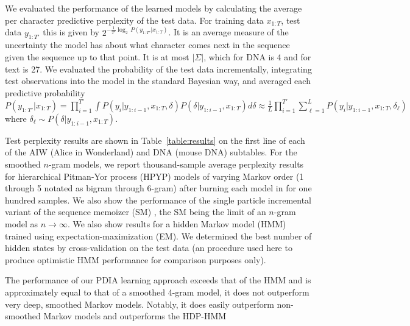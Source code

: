 We evaluated the performance of the learned models by calculating the average per character predictive perplexity of the test data.  For training data $x_{1:T}$, test data $y_{1:T'}$ this is given by $2^{-\frac{1}{T'}\log_2\, P(y_{1:T'}|x_{1:T})}$.  It is an average measure of the uncertainty the model has about what character comes next in the sequence given the sequence up to that point. It is at most $|\Sigma|$, which for DNA is 4 and for text is 27.  We evaluated the probability of the test data incrementally, integrating test observations into the model in the standard Bayesian way, and averaged each predictive probability $P(y_{1:T'}|x_{1:T}) =  \prod_{i = 1}^{T'} \int P(y_i|y_{1:i-1},x_{1:T},\delta)P(\delta|y_{1:i-1},x_{1:T})d\delta \approx \frac{1}{L}\prod_{i = 1}^{T'} \sum_{\ell = 1}^{L} P(y_i|y_{1:i-1},x_{1:T},\delta_\ell)$ where $\delta_\ell \sim P(\delta|y_{1:i-1},x_{1:T})$.  %

Test perplexity results are shown in Table~\ref{table:results} on the first line of each of the AIW (Alice in Wonderland) and DNA (mouse DNA) subtables.  
For the smoothed $n$-gram models, we report thousand-sample average perplexity results for hierarchical Pitman-Yor process (HPYP) \cite{Teh2006} models of varying Markov order (1 through 5 notated as bigram through 6-gram) after burning each model in for one hundred samples.  We also show the performance of the single particle incremental variant of the sequence memoizer (SM) \cite{Gasthaus2010}, the SM being the limit of an $n$-gram model as $n\rightarrow\infty$.
We also show results for a hidden Markov model (HMM) \cite{Murphy} trained using expectation-maximization (EM).  We determined the best number of hidden states by cross-validation on the test data (an procedure used here to produce optimistic HMM performance for comparison purposes only).  


The performance of our PDIA learning approach exceeds that of the HMM and is approximately equal to that of a smoothed 4-gram model, it does not outperform very deep, smoothed Markov models.  Notably, it does easily outperform non-smoothed Markov models and outperforms the HDP-HMM 

